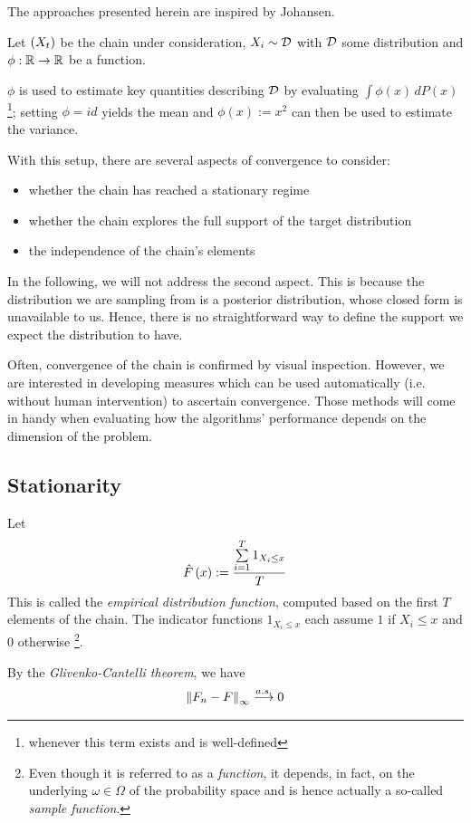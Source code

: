 
The approaches presented herein are inspired by Johansen\cite{mcnotes}.



Let $\left(X_t\right)$ be the chain under consideration, $X_i \sim \mathcal{D}$ with $\mathcal{D}$ some distribution and $\phi : \mathbb{R} \rightarrow \mathbb{R}$ be a function. 

$\phi$ is used to estimate key quantities describing $\mathcal{D}$ by evaluating $\int \phi(x) \, dP(x)$\footnote{whenever this term exists and is well-defined}; setting $\phi = id$ yields the mean and $\phi(x) := x^2$ can then be used to estimate the variance. 

 
With this setup, there are several aspects of convergence to consider: 
\begin{itemize}
	\item whether the chain has reached a stationary regime
	\item whether the chain explores the full support of the target distribution 
	\item the independence of the chain's elements 
\end{itemize}

In the following, we will not address the second aspect.
This is because the distribution we are sampling from is a posterior distribution, whose closed form is unavailable to us. Hence, there is no straightforward way to define the support we expect the distribution to have.

Often, convergence of the chain is confirmed by visual inspection. However, we are interested in developing measures which can be used automatically (i.e. without human intervention) to ascertain convergence. Those methods will come in handy when evaluating how the algorithms' performance depends on the dimension of the problem.

\subsection{Stationarity}
Let 
\[
	\hat{F}\left(x\right) := \frac{\sum\limits_{i=1}^T 1_{X_i \leq x}}{T}
\]
This is called the \textit{empirical distribution function}, computed based on the first $T$ elements of the chain.
The indicator functions $1_{X_i \leq x}$ each assume $1$ if $X_i \leq x$ and $0$ otherwise \footnote{Even though it is referred to as a \textit{function}, it depends, in fact, on the underlying $\omega \in \Omega$ of the probability space and is hence actually a so-called \textit{sample function}. }. 

By the \textit{Glivenko-Cantelli theorem}, we have
\[
	\left\lVert F_n - F\right\rVert_\infty \overset{a.s.}{\longrightarrow} 0
\]

